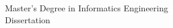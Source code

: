 \pagestyle{empty}
%
%
%
%
%
%
%

\sffamily

\vspace{0.5cm}
\LARGE{Master's Degree in Informatics Engineering}\\[1pc]
\Large{Dissertation}\\[2pc]

